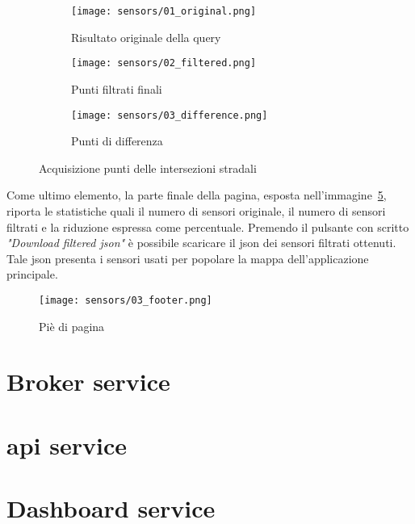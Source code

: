 \begin{figure}[H]
  \centering

  \begin{subfigure}{\textwidth}
    \centering
    \texttt{[image: sensors/01\_original.png]}
    \caption{Risultato originale della query}
    \label{fig:sensors-before}
  \end{subfigure}

  \hfill
  \begin{subfigure}{\textwidth}
    \centering
    \texttt{[image: sensors/02\_filtered.png]}
    \caption{Punti filtrati finali}
    \label{fig:sensors-after}
  \end{subfigure}


  \hfill
  \begin{subfigure}{\textwidth}
    \centering
    \texttt{[image: sensors/03\_difference.png]}
    \caption{Punti di differenza}
    \label{fig:sensors-difference}
  \end{subfigure}

  \caption{Acquisizione punti delle intersezioni stradali}
\end{figure}

Come ultimo elemento, la parte finale della pagina, esposta nell'immagine~\ref{fig:sensors-footer},
riporta le statistiche quali il numero di sensori originale,
il numero di sensori filtrati e la riduzione espressa come percentuale.
Premendo il pulsante con scritto \textit{"Download filtered \acrshort{json}"} è possibile scaricare il json dei sensori
filtrati ottenuti. Tale \acrshort{json} presenta i sensori usati per popolare la mappa dell'applicazione principale.

\begin{figure}[H]
  \centering
  \texttt{[image: sensors/03\_footer.png]}
  \caption{Piè di pagina}
  \label{fig:sensors-footer}
\end{figure}

\section{Broker service}
\section{\acrshort{api} service}
\section{Dashboard service}

